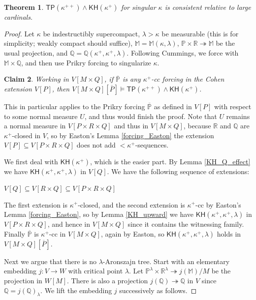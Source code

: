\documentclass[10pt,reqno]{amsart}
\theoremstyle{plain}
\newtheorem{theorem}{Theorem}[section]
\newtheorem{claim}[theorem]{Claim}
\theoremstyle{definition}
\theoremstyle{remark}
\begin{document}
\begin{theorem}
$\mathsf{TP(\kappa^{++})\land\mathsf{KH}(\kappa^+)}$ for singular $\kappa$ is consistent relative to large cardinals.
\end{theorem}
\begin{proof}
Let $\kappa$ be indestructibly supercompact, $\lambda>\kappa$ be measurable (this is for simplicity; weakly compact should suffice), $\mathbb{M}=\mathbb{M}(\kappa,\lambda)$, $\mathbb{P}\times\mathbb{R}\twoheadrightarrow\mathbb{M}$ be the usual projection, and $\mathbb{Q}=\mathbb{Q}(\kappa^+,\kappa^+,\lambda)$. Following Cummings, we force with $\mathbb{M}\times\mathbb{Q}$, and then use Prikry forcing to singularize $\kappa$. 

\begin{claim}
Working in $V[M\times Q]$, if $\overline{\mathbb{P}}$ is any $\kappa^+$-cc forcing in the Cohen extension $V[P]$, then $V[M\times Q][\overline{P}]\models\mathsf{TP(\kappa^{++})\land\mathsf{KH}(\kappa^+)}$.
\end{claim}


This in particular applies to the Prikry forcing $\mathbb{\overline{P}}$ as defined in $V[P]$ with respect to some normal measure $U$, and thus would finish the proof. Note that $U$ remains a normal measure in $V[P\times R\times Q]$ and thus in $V[M\times Q]$, because $\mathbb{R}$ and $\mathbb{Q}$ are $\kappa^+$-closed in $V$, so by Easton's Lemma \ref{forcing_Easton} the extension $V[P]\subseteq V[P\times R\times Q]$ does not add $<\kappa^+$-sequences.

We first deal with $\mathsf{KH}(\kappa^+)$, which is the easier part. By Lemma \ref{KH_Q_effect} we have $\mathsf{KH}(\kappa^+,\kappa^+,\lambda)$ in $V[Q]$. We have the following sequence of extensions:

\begin{center}
$V[Q]\subseteq V[R\times Q]\subseteq V[P\times R\times Q]$
\end{center}

The first extension is $\kappa^+$-closed, and the second extension is $\kappa^+$-cc by Easton's Lemma \ref{forcing_Easton}, so by Lemma \ref{KH_upward} we have $\mathsf{KH}(\kappa^+,\kappa^+,\lambda)$ in $V[P\times R\times Q]$, and hence in $V[M\times Q]$ since it contains the witnessing family. Finally $\overline{\mathbb{P}}$ is $\kappa^+$-cc in $V[M\times Q]$, again by Easton, so $\mathsf{KH}(\kappa^+,\kappa^+,\lambda)$ holds in $V[M\times Q][\overline{P}]$.

Next we argue that there is no $\lambda$-Aronszajn tree. Start with an elementary embedding $j:V\rightarrow W$ with critical point $\lambda$. Let $\mathbb{P}^\lambda\times\mathbb{R}^\lambda\twoheadrightarrow j(\mathbb{M})/M$ be the projection in $W[M]$. There is also a projection $j(\mathbb{Q})\twoheadrightarrow\mathbb{Q}$ in $V$ since $\mathbb{Q}=j(\mathbb{Q})_\lambda$. We lift the embedding $j$ successively as follows.


\end{proof}
\end{document}
